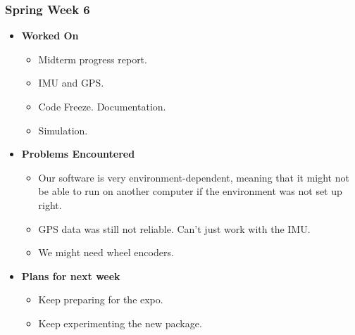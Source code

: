 \documentclass[compsoc,draftclsnofoot,onecolumn,10pt]{IEEEtran}
\begin{document}
\subsubsection{Spring Week 6}
\begin{itemize}
    \item {\textbf{Worked On}}
    \begin{itemize}
      \item Midterm progress report.
      \item IMU and GPS.
      \item Code Freeze. Documentation.
      \item Simulation.
    \end{itemize}

    \item {\textbf{Problems Encountered}}
    \begin{itemize}
      \item Our software is very environment-dependent, meaning that it might not
      be able to run on another computer if the environment was not set up right.
      \item GPS data was still not reliable. Can't just work with the IMU.
      \item We might need wheel encoders.
    \end{itemize}

    \item{\textbf{Plans for next week}}
    \begin{itemize}
      \item Keep preparing for the expo.
      \item Keep experimenting the new package.
    \end{itemize}

\end{itemize}
\end{document}
